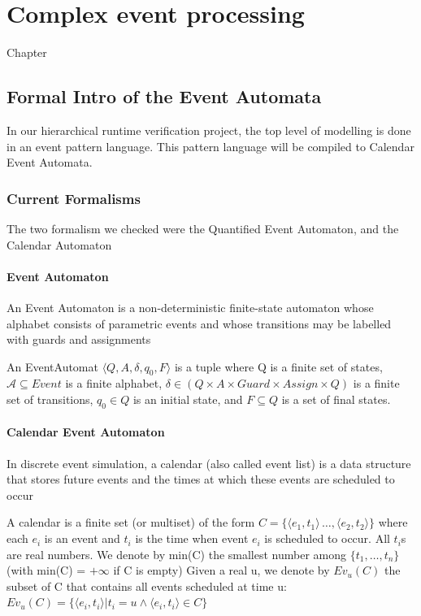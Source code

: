 \chapter{Complex event processing}
\label{chap:cep}
Chapter
\section{Formal Intro of the Event Automata}
	In our hierarchical runtime verification project, the top level of modelling is done in an event pattern language.
	This pattern language will be compiled to Calendar Event Automata.
	\subsection{Current Formalisms}
		The two formalism we checked were the Quantified Event Automaton, and the Calendar Automaton
		\subsubsection{Event Automaton}
			An Event Automaton is a non-deterministic finite-state automaton whose alphabet consists
			of parametric events and whose transitions may be labelled with guards and assignments
			
			\begin{dfn}
			An EventAutomat 
			$\langle Q,A,\delta, q_0, F \rangle$ is a tuple where Q is a finite set of states, 
			$\mathcal{A} \subseteq Event$ is a finite alphabet,  %
			$\delta \in (Q \times A \times Guard \times Assign \times Q)$ is a finite set of transitions, 
			$q_0 \in Q$ is an initial state, and 
			$F \subseteq Q$ is a set of final states.
			\end{dfn}
			
		\subsubsection{Calendar Event Automaton}
			In discrete event simulation, a calendar (also called event list) is a data structure that
			stores future events and the times at which these events are scheduled to occur
			
			\begin{dfn}
			A calendar is a finite set (or multiset) of the form $C = \{ \langle e_1, t_1\rangle \, \dots ,\langle e_2, t_2\rangle \}$
			where each $e_i$ is an event and $t_i$ is the time when event $e_i$ is scheduled to occur. All $t_i$s are real numbers.
			We denote by min(C) the smallest number among $\{t_1,\dots ,t_n \}$ (with min(C) = $+\infty$ if C is empty)
			Given a real u, we denote by $Ev_u(C)$ the subset of C that contains all events scheduled at time u:
			$Ev_u(C) = \{ \langle e_i, t_i \rangle  | t_i = u \wedge \langle e_i , t_i \rangle \in C \} $
			\end{dfn}
			

